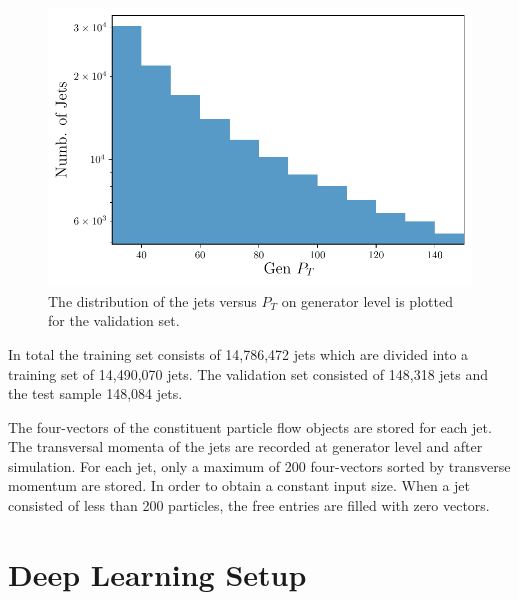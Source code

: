 \documentclass[12pt, a4paper]{thesis}
\begin{document}
\begin{figure}[hbtp]
  \centering
  \includegraphics[width=.9\linewidth]{../images/jet_distri.pdf}
  \caption{ The distribution of the jets versus \(P_T\) on generator
    level is plotted for the validation set.}
  \label{jet_distri}
\end{figure}

In total the training set consists of 14,786,472 jets which are
divided into a training set of 14,490,070 jets. The validation set
consisted of 148,318 jets and the test sample 148,084 jets.

The four-vectors of the constituent particle flow objects are stored
for each jet. The transversal momenta of the jets are recorded at
generator level and after simulation. For each jet, only a maximum of
200 four-vectors sorted by transverse momentum are stored. In order to
obtain a constant input size. When a jet consisted of less than 200
particles, the free entries are filled with zero vectors.

\clearpage
\section{Deep Learning Setup}
\label{sec:orgf3b24cc}

\end{document}
